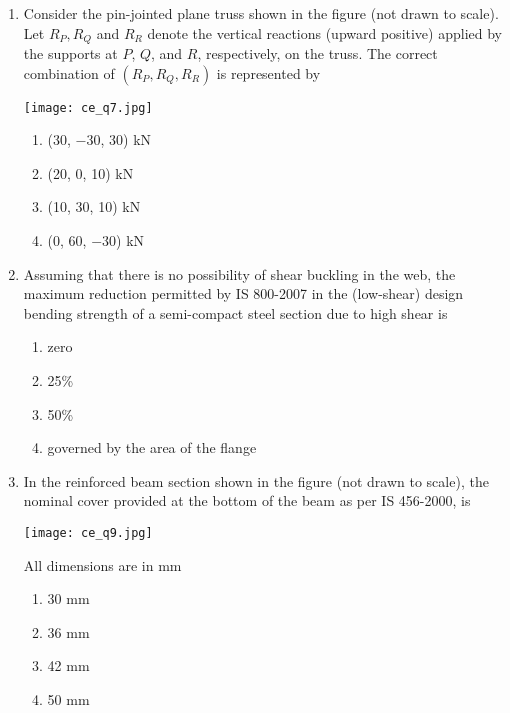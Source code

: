 \documentclass[12pt]{article}
\begin{document}
\begin{enumerate}[label=Q.\arabic*]
	\item Consider the pin-jointed plane truss shown in the figure (not drawn to scale). Let $R_P, R_Q$ and $R_R$ denote the vertical reactions (upward positive) applied by the supports at $P$, $Q$, and $R$, respectively, on the truss. The correct combination of $(R_P, R_Q, R_R)$ is represented by  
		\begin{center}
			\texttt{[image: ce\_q7.jpg]}
		\end{center}
		\begin{multicols}{2}
			\begin{enumerate}[label=(\Alph*)]
				\item (30, $-30$, 30) kN  
				\item (20, 0, 10) kN  
				\item (10, 30, 10) kN  
				\item (0, 60, $-30$) kN  
			\end{enumerate}
		\end{multicols}
	\item Assuming that there is no possibility of shear buckling in the web, the maximum reduction permitted by IS 800-2007 in the (low-shear) design bending strength of a semi-compact steel section due to high shear is  
		\begin{multicols}{2}
			\begin{enumerate}[label=(\Alph*)]
				\item zero  
				\item 25\%  
				\item 50\%  
				\item governed by the area of the flange  
			\end{enumerate}
		\end{multicols}

	\item In the reinforced beam section shown in the figure (not drawn to scale), the nominal cover provided at the bottom of the beam as per IS 456-2000, is  
		\begin{center}
			\texttt{[image: ce\_q9.jpg]}
		\end{center}
		All dimensions are in mm  
		\begin{multicols}{2}
			\begin{enumerate}[label=(\Alph*)]
				\item 30 mm  
				\item 36 mm  
				\item 42 mm  
				\item 50 mm  
			\end{enumerate}
		\end{multicols}


\end{enumerate}
\end{document}
